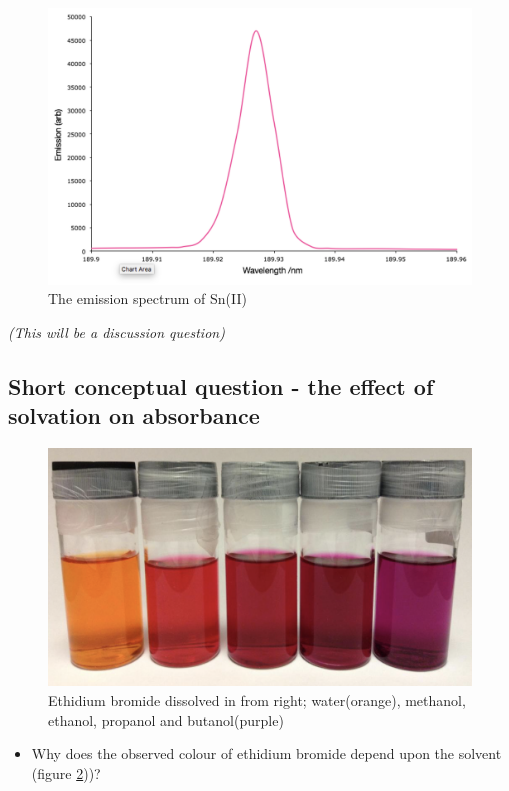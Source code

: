 \documentclass[
]{book}
\providecommand{\tightlist}{%
  \setlength{\itemsep}{0pt}\setlength{\parskip}{0pt}}
\begin{document}
\begin{figure}

{\centering \includegraphics[width=0.7\linewidth]{images/atomic_emission_spectrum} 

}

\caption{The emission spectrum of Sn(II)}\label{fig:atomictin}
\end{figure}

\emph{(This will be a discussion question)}

\hypertarget{subsec:solvationabs}{%
\subsection{Short conceptual question - the effect of solvation on absorbance}\label{subsec:solvationabs}}

\begin{figure}

{\centering \includegraphics[width=0.7\linewidth]{images/ethidium} 

}

\caption{Ethidium bromide dissolved in from right; water(orange), methanol, ethanol, propanol and butanol(purple)}\label{fig:ethidiumsolvent}
\end{figure}

\begin{itemize}
\tightlist
\item
  Why does the observed colour of ethidium bromide depend upon the solvent (figure \ref{fig:ethidiumsolvent}))?
\end{itemize}
\end{document}
